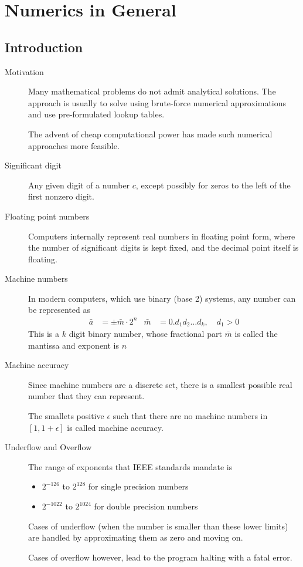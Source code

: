 \chapter{Numerics in General}

\section{Introduction}

\begin{description}
    \item[Motivation] Many mathematical problems do not admit analytical solutions. The
        approach is usually to solve using brute-force numerical approximations and use
        pre-formulated lookup tables. \par
        The advent of cheap computational power has made such numerical approaches more
        feasible.

    \item[Significant digit] Any given digit of a number $ c $, except possibly for zeros
        to the left of the first nonzero digit.

    \item[Floating point numbers] Computers internally represent real numbers in
        floating point form, where the number of significant digits is kept fixed, and
        the decimal point itself is floating.

    \item[Machine numbers] In modern computers, which use binary (base 2) systems,
        any number can be represented as
        \begin{align}
            \bar{a} & = \pm \bar{m} \cdot 2^n            &
            \bar{m} & = 0.d_1d_2\dots d_k, \quad d_1 > 0
        \end{align}
        This is a $ k $ digit binary number, whose fractional part $ \bar{m} $ is called
        the mantissa and exponent is $ n $

    \item[Machine accuracy] Since machine numbers are a discrete set, there is a
        smallest possible real number that they can represent. \par
        The smallets positive $ \epsilon $ such that there are no machine numbers in
        $ [1, 1 + \epsilon] $ is called machine accuracy.

    \item[Underflow and Overflow] The range of exponents that IEEE standards mandate is
        \begin{itemize}
            \item $ 2^{-126} $ to $ 2^{128} $ for single precision numbers
            \item $ 2^{-1022} $ to $ 2^{1024} $ for double precision numbers
        \end{itemize}
        Cases of underflow (when the number is smaller than these lower limits) are
        handled by approximating them as zero and moving on. \par
        Cases of overflow however, lead to the program halting with a fatal error.


\end{description}

